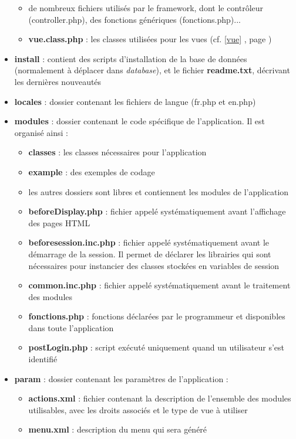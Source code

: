 \begin{itemize}
\begin{itemize}
\item de nombreux fichiers utilisés par le framework, dont le contrôleur (controller.php), des fonctions génériques (fonctions.php)...
\item \textbf{vue.class.php} : les classes utilisées pour les vues (cf. \ref{vue} \textit{}, page \pageref{vue})
\end{itemize}
\item \textbf{install} : contient des scripts d'installation de la base de données (normalement à déplacer dans \textit{database}), et le fichier \textbf{readme.txt}, décrivant les dernières nouveautés
\item \textbf{locales} : dossier contenant les fichiers de langue (fr.php et en.php)
\item \textbf{modules} : dossier contenant le code spécifique de l'application. Il est organisé ainsi :
\begin{itemize}
\item \textbf{classes} : les classes nécessaires pour l'application
\item \textbf{example} : des exemples de codage
\item les autres dossiers sont libres et contiennent les modules de l'application
\item \textbf{beforeDisplay.php} : fichier appelé systématiquement avant l'affichage des pages HTML
\item \textbf{beforesession.inc.php} : fichier appelé systématiquement avant le démarrage de la session. Il permet de déclarer les librairies qui sont nécessaires pour instancier des classes stockées en variables de session
\item \textbf{common.inc.php} : fichier appelé systématiquement avant le traitement des modules
\item \textbf{fonctions.php} : fonctions déclarées par le programmeur et disponibles dans toute l'application 
\item \textbf{postLogin.php} : script exécuté uniquement quand un utilisateur s'est identifié
\end{itemize}
\item \textbf{param} : dossier contenant les paramètres de l'application :
\begin{itemize}
\item \textbf{actions.xml} : fichier contenant la description de l'ensemble des modules utilisables, avec les droits associés et le type de vue à utiliser
\item \textbf{menu.xml} : description du menu qui sera généré

\end{itemize}
\end{itemize}
